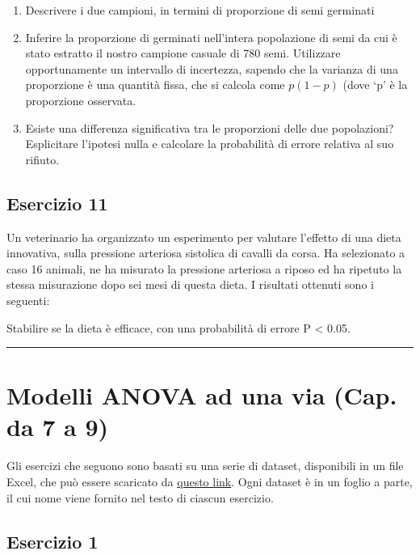 \documentclass[a4paper,12pt,oneside]{book}
\providecommand{\tightlist}{%
  \setlength{\itemsep}{0pt}\setlength{\parskip}{0pt}}
\begin{document}
\begin{enumerate}
\def\labelenumi{\arabic{enumi}.}
\tightlist
\item
  Descrivere i due campioni, in termini di proporzione di semi germinati
\item
  Inferire la proporzione di germinati nell'intera popolazione di semi da cui è stato estratto il nostro campione casuale di 780 semi. Utilizzare opportunamente un intervallo di incertezza, sapendo che la varianza di una proporzione è una quantità fissa, che si calcola come \(p ( 1- p)\) (dove `p' è la proporzione osservata.
\item
  Esiste una differenza significativa tra le proporzioni delle due popolazioni? Esplicitare l'ipotesi nulla e calcolare la probabilità di errore relativa al suo rifiuto.
\end{enumerate}

\hypertarget{esercizio-11}{%
\subsection{Esercizio 11}\label{esercizio-11}}

Un veterinario ha organizzato un esperimento per valutare l'effetto di una dieta innovativa, sulla pressione arteriosa sistolica di cavalli da corsa. Ha selezionato a caso 16 animali, ne ha misurato la pressione arteriosa a riposo ed ha ripetuto la stessa misurazione dopo sei mesi di questa dieta. I risultati ottenuti sono i seguenti:

Stabilire se la dieta è efficace, con una probabilità di errore P \textless{} 0.05.

\begin{center}\rule{0.5\linewidth}{0.5pt}\end{center}

\hypertarget{modelli-anova-ad-una-via-cap.-da-7-a-9}{%
\section{Modelli ANOVA ad una via (Cap. da 7 a 9)}\label{modelli-anova-ad-una-via-cap.-da-7-a-9}}

Gli esercizi che seguono sono basati su una serie di dataset, disponibili in un file Excel, che può essere scaricato da \href{https://www.casaonofri.it/_datasets/EserciziTesto.xlsx}{questo link}. Ogni dataset è in un foglio a parte, il cui nome viene fornito nel testo di ciascun esercizio.

\hypertarget{esercizio-1-5}{%
\subsection{Esercizio 1}\label{esercizio-1-5}}
\end{document}
